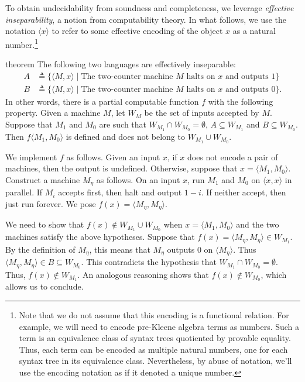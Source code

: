 \documentclass[a4paper,UKenglish,cleveref, autoref, thm-restate]{lipics-v2021}
\begin{document}
To obtain undecidability from soundness and completeness, we leverage
\emph{effective inseparability}, a notion from computability theory.  In what
follows, we use the notation $ \langle x \rangle $ to refer to some effective
encoding of the object $x$ as a natural number.\footnote{%
  Note that we do not assume that this encoding is a functional relation. For
  example, we will need to encode pre-Kleene algebra terms as numbers.  Such a
  term is an equivalence class of syntax trees quotiented by provable equality.
  Thus, each term can be encoded as multiple natural numbers, one for each
  syntax tree in its equivalence class.  Nevertheless, by abuse of notation,
  we'll use the encoding notation as if it denoted a unique number.}

\begin{theoremEnd}{theorem}
  \label{thm:basic-inseparability}
  The following two languages are effectively inseparable:
  \begin{align*}
    A &  \triangleq  \{  \langle  M ,x \rangle   \mid  \text{The two-counter machine $M$ halts on $x$ and outputs 1}\} \\
    B &  \triangleq  \{  \langle  M ,x \rangle   \mid  \text{The two-counter machine $M$ halts on $x$ and outputs 0}\}.
  \end{align*}
  In other words, there is a partial computable function $f$ with the following
  property.  Given a machine $M$, let $W_M$ be the set of inputs accepted by
  $M$.  Suppose that $M_1$ and $M_0$ are such that
  $W_{M_1} \cap W_{M_0} = \emptyset$, $A \subseteq W_{M_1}$ and
  $B \subseteq W_{M_0}$.  Then $f\langle M_1, M_0 \rangle$ is defined and does
  not belong to $W_{M_1} \cup W_{M_0}$.
\end{theoremEnd}

\begin{proofEnd}
  We implement $f$ as follows. Given an input $x$, if $x$ does not encode a pair
  of machines, then the output is undefined.  Otherwise, suppose that
  $x = \langle M_1, M_0 \rangle$.  Construct a machine $M_\eta$ as follows.  On
  an input $x$, run $M_1$ and $M_0$ on $\langle x, x \rangle$ in parallel.  If
  $M_i$ accepts first, then halt and output $1 - i$. If neither accept, then
  just run forever.  We pose $f(x) = \langle M_\eta, M_\eta \rangle$.

  We need to show that $f(x) \notin W_{M_1} \cup W_{M_0}$ when
  $x = \langle M_1, M_0\rangle$ and the two machines satisfy the above
  hypotheses.  Suppose that $f(x) = \langle M_\eta, M_\eta \rangle \in W_{M_1}$.
  By the definition of $M_\eta$, this means that $M_\eta$ outputs 0 on
  $\langle M_\eta \rangle$.  Thus
  $\langle M_\eta, M_\eta \rangle \in B \subseteq W_{M_0}$. This contradicts the
  hypothesis that $W_{M_1} \cap W_{M_0} = \emptyset$.  Thus,
  $f(x) \notin W_{M_1}$.  An analogous reasoning shows that
  $f(x) \notin W_{M_0}$, which allows us to conclude.
\end{proofEnd}
\end{document}
